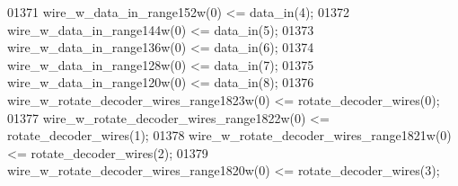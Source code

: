 \begin{DoxyCode}
{01371     \textcolor{vhdlchar}{wire_w_data_in_range152w}\textcolor{vhdlchar}{(}\textcolor{vhdllogic}{}\textcolor{vhdllogic}{0}\textcolor{vhdlchar}{)} \textcolor{vhdlchar}{<=} \textcolor{vhdlchar}{data_in}\textcolor{vhdlchar}{(}\textcolor{vhdllogic}{}\textcolor{vhdllogic}{4}\textcolor{vhdlchar}{)};
01372     \textcolor{vhdlchar}{wire_w_data_in_range144w}\textcolor{vhdlchar}{(}\textcolor{vhdllogic}{}\textcolor{vhdllogic}{0}\textcolor{vhdlchar}{)} \textcolor{vhdlchar}{<=} \textcolor{vhdlchar}{data_in}\textcolor{vhdlchar}{(}\textcolor{vhdllogic}{}\textcolor{vhdllogic}{5}\textcolor{vhdlchar}{)};
01373     \textcolor{vhdlchar}{wire_w_data_in_range136w}\textcolor{vhdlchar}{(}\textcolor{vhdllogic}{}\textcolor{vhdllogic}{0}\textcolor{vhdlchar}{)} \textcolor{vhdlchar}{<=} \textcolor{vhdlchar}{data_in}\textcolor{vhdlchar}{(}\textcolor{vhdllogic}{}\textcolor{vhdllogic}{6}\textcolor{vhdlchar}{)};
01374     \textcolor{vhdlchar}{wire_w_data_in_range128w}\textcolor{vhdlchar}{(}\textcolor{vhdllogic}{}\textcolor{vhdllogic}{0}\textcolor{vhdlchar}{)} \textcolor{vhdlchar}{<=} \textcolor{vhdlchar}{data_in}\textcolor{vhdlchar}{(}\textcolor{vhdllogic}{}\textcolor{vhdllogic}{7}\textcolor{vhdlchar}{)};
01375     \textcolor{vhdlchar}{wire_w_data_in_range120w}\textcolor{vhdlchar}{(}\textcolor{vhdllogic}{}\textcolor{vhdllogic}{0}\textcolor{vhdlchar}{)} \textcolor{vhdlchar}{<=} \textcolor{vhdlchar}{data_in}\textcolor{vhdlchar}{(}\textcolor{vhdllogic}{}\textcolor{vhdllogic}{8}\textcolor{vhdlchar}{)};
01376     \textcolor{vhdlchar}{wire_w_rotate_decoder_wires_range1823w}\textcolor{vhdlchar}{(}\textcolor{vhdllogic}{}\textcolor{vhdllogic}{0}\textcolor{vhdlchar}{)} \textcolor{vhdlchar}{<=} \textcolor{vhdlchar}{rotate_decoder_wires}\textcolor{vhdlchar}{(}\textcolor{vhdllogic}{}\textcolor{vhdllogic}{0}\textcolor{vhdlchar}{)};
01377     \textcolor{vhdlchar}{wire_w_rotate_decoder_wires_range1822w}\textcolor{vhdlchar}{(}\textcolor{vhdllogic}{}\textcolor{vhdllogic}{0}\textcolor{vhdlchar}{)} \textcolor{vhdlchar}{<=} \textcolor{vhdlchar}{rotate_decoder_wires}\textcolor{vhdlchar}{(}\textcolor{vhdllogic}{}\textcolor{vhdllogic}{1}\textcolor{vhdlchar}{)};
01378     \textcolor{vhdlchar}{wire_w_rotate_decoder_wires_range1821w}\textcolor{vhdlchar}{(}\textcolor{vhdllogic}{}\textcolor{vhdllogic}{0}\textcolor{vhdlchar}{)} \textcolor{vhdlchar}{<=} \textcolor{vhdlchar}{rotate_decoder_wires}\textcolor{vhdlchar}{(}\textcolor{vhdllogic}{}\textcolor{vhdllogic}{2}\textcolor{vhdlchar}{)};
01379     \textcolor{vhdlchar}{wire_w_rotate_decoder_wires_range1820w}\textcolor{vhdlchar}{(}\textcolor{vhdllogic}{}\textcolor{vhdllogic}{0}\textcolor{vhdlchar}{)} \textcolor{vhdlchar}{<=} \textcolor{vhdlchar}{rotate_decoder_wires}\textcolor{vhdlchar}{(}\textcolor{vhdllogic}{}\textcolor{vhdllogic}{3}\textcolor{vhdlchar}{)};
}
\end{DoxyCode}

